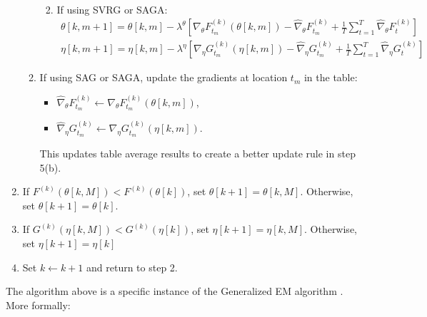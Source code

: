 \begin{enumerate}
\begin{enumerate}
\begin{enumerate}
\begin{gather}
            \end{gather}
            \item If using SVRG or SAGA:
            \begin{gather}
                \theta[k,m+1] = \theta[k,m] - \lambda^{\theta} \left[\nabla_\theta F_{t_m}^{(k)}(\theta[k,m]) - \widehat \nabla_\theta F_{t_m}^{(k)} + \frac{1}{T} \sum_{t=1}^T \widehat \nabla_\theta F^{(k)}_{t} \right] \\
                \eta[k,m+1] = \eta[k,m] - \lambda^{\eta} \left[\nabla_\eta G_{t_m}^{(k)}(\eta[k,m]) - \widehat \nabla_\eta G_{t_m}^{(k)} + \frac{1}{T} \sum_{t=1}^T \widehat \nabla_\eta G^{(k)}_{t} \right]
            \end{gather}
        \end{enumerate}
        \item If using SAG or SAGA, update the gradients at location $t_m$ in the table:
        \begin{itemize}
            \item $\widehat \nabla_\theta F_{t_m}^{(k)} \leftarrow \nabla_\theta F_{t_m}^{(k)}(\theta[k,m])$,
            \item $\widehat \nabla_\eta G_{t_m}^{(k)} \leftarrow \nabla_\eta G_{t_m}^{(k)}(\eta[k,m])$.
        \end{itemize}
        This updates table average results to create a better update rule in step 5(b).
    \end{enumerate}
    \item If $F^{(k)}(\theta[k,M]) < F^{(k)}(\theta[k])$, set $\theta[k+1] = \theta[k,M]$. Otherwise, set $\theta[k+1] = \theta[k]$.
    \item If $G^{(k)}(\eta[k,M]) < G^{(k)}(\eta[k])$, set $\eta[k+1] = \eta[k,M]$. Otherwise, set $\eta[k+1] = \eta[k]$
    \item Set $k \leftarrow k+1$ and return to step 2.
\end{enumerate}

The algorithm above is a specific instance of the Generalized EM algorithm \citep{Dempster:1977}. More formally:

